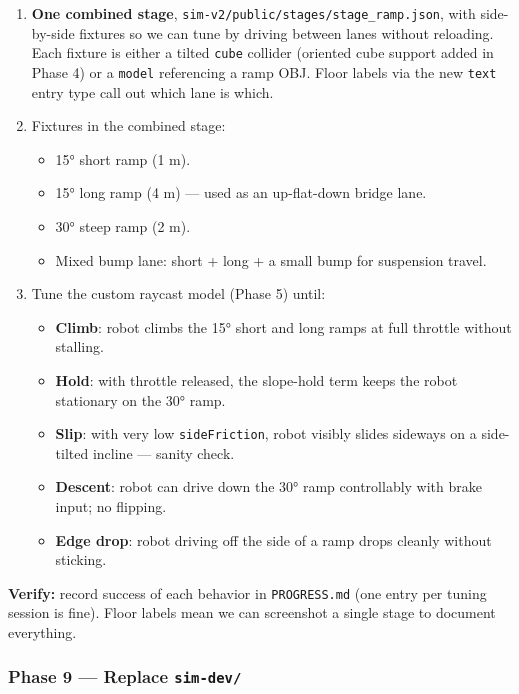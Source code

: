 \documentclass[
]{article}
\providecommand{\tightlist}{%
  \setlength{\itemsep}{0pt}\setlength{\parskip}{0pt}}
\begin{document}
\begin{enumerate}
\def\labelenumi{\arabic{enumi}.}
\tightlist
\item
  \textbf{One combined stage},
  \texttt{sim-v2/public/stages/stage\_ramp.json}, with side-by-side
  fixtures so we can tune by driving between lanes without reloading.
  Each fixture is either a tilted \texttt{cube} collider (oriented cube
  support added in Phase 4) or a \texttt{model} referencing a ramp OBJ.
  Floor labels via the new \texttt{text} entry type call out which lane
  is which.
\item
  Fixtures in the combined stage:

  \begin{itemize}
  \tightlist
  \item
    15° short ramp (1 m).
  \item
    15° long ramp (4 m) --- used as an up-flat-down bridge lane.
  \item
    30° steep ramp (2 m).
  \item
    Mixed bump lane: short + long + a small bump for suspension travel.
  \end{itemize}
\item
  Tune the custom raycast model (Phase 5) until:

  \begin{itemize}
  \tightlist
  \item
    \textbf{Climb}: robot climbs the 15° short and long ramps at full
    throttle without stalling.
  \item
    \textbf{Hold}: with throttle released, the slope-hold term keeps the
    robot stationary on the 30° ramp.
  \item
    \textbf{Slip}: with very low \texttt{sideFriction}, robot visibly
    slides sideways on a side-tilted incline --- sanity check.
  \item
    \textbf{Descent}: robot can drive down the 30° ramp controllably
    with brake input; no flipping.
  \item
    \textbf{Edge drop}: robot driving off the side of a ramp drops
    cleanly without sticking.
  \end{itemize}
\end{enumerate}

\textbf{Verify:} record success of each behavior in \texttt{PROGRESS.md}
(one entry per tuning session is fine). Floor labels mean we can
screenshot a single stage to document everything.

\subsubsection{\texorpdfstring{Phase 9 --- Replace
\texttt{sim-dev/}}{Phase 9 --- Replace sim-dev/}}\label{phase-9-replace-sim-dev}
\end{document}
